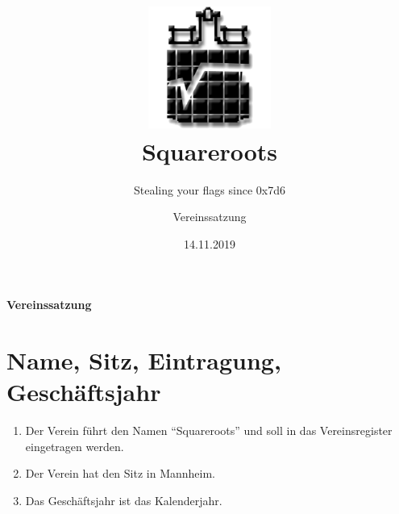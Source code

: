 \documentclass[a4paper,ngerman]{scrartcl}
\begin{document}
\title{\includegraphics[width=0.3\textwidth]{sqrts}\\[1cm]Squareroots}
\subtitle{Stealing your flags since 0x7d6}
\date{14.11.2019}
\author{Vereinssatzung}

\maketitle
\pagebreak



\textbf{\huge{}Vereinssatzung}{\huge \par}

\section{Name, Sitz, Eintragung, Geschäftsjahr}
\begin{enumerate}
\item Der Verein führt den Namen "`Squareroots"' und soll in das Vereinsregister eingetragen werden.
\item Der Verein hat den Sitz in Mannheim.
\item Das Geschäftsjahr ist das Kalenderjahr.
\end{enumerate}
\end{document}
